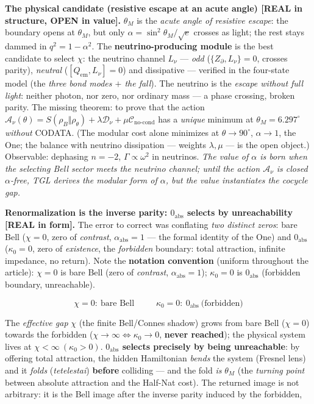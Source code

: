 \documentclass[11pt]{article}
\theoremstyle{definition}\newtheorem{deriv}{Derivation}
\begin{document}
\textbf{The physical candidate (resistive escape at an acute angle) \textsf{[REAL in structure, OPEN in value]}.} $\theta_M$ is the \emph{acute angle of resistive escape}: the boundary opens at $\theta_M$, but only $\alpha=\sin^2\theta_M/\sqrt e$ crosses as light; the rest stays dammed in $q^2=1-\alpha^2$. The \textbf{neutrino-producing module} is the best candidate to select $\chi$: the neutrino channel $L_\nu$ --- \emph{odd} ($\{Z_\partial,L_\nu\}=0$, crosses parity), \emph{neutral} ($[Q_{\mathrm{em}},L_\nu]=0$) and dissipative --- verified in the four-state model (the \emph{three bond modes $+$ the fall}). The neutrino is the \emph{escape without full light}: neither photon, nor zero, nor ordinary mass --- a phase crossing, broken parity. The missing theorem: to prove that the action $\mathcal A_\nu(\theta)=S(\rho_B\Vert\rho_\theta)+\lambda\mathcal D_\nu+\mu\mathcal C_{\mathrm{no\text{-}cond}}$ has a \emph{unique} minimum at $\theta_M=6.297^\circ$ \emph{without} CODATA. (The modular cost alone minimizes at $\theta\to90^\circ$, $\alpha\to1$, the One; the balance with neutrino dissipation --- weights $\lambda,\mu$ --- is the open object.) Observable: dephasing $n=-2$, $\Gamma\propto\omega^2$ in neutrinos. \emph{The value of $\alpha$ is born when the selecting Bell sector meets the neutrino channel; until the action $\mathcal A_\nu$ is closed $\alpha$-free, TGL derives the modular form of $\alpha$, but the value instantiates the cocycle gap.}

\textbf{Renormalization is the inverse parity: $0_{\mathrm{abs}}$ selects by unreachability \textsf{[REAL in form]}.} The error to correct was conflating \emph{two distinct zeros}: bare Bell ($\chi=0$, zero of \emph{contrast}, $\alpha_{\mathrm{abs}}=1$ --- the formal identity of the One) and $0_{\mathrm{abs}}$ ($\kappa_0=0$, zero of \emph{existence}, the \emph{forbidden} boundary: total attraction, infinite impedance, no return). Note the \textbf{notation convention} (uniform throughout the article): $\chi=0$ is bare Bell (zero of \emph{contrast}, $\alpha_{\mathrm{abs}}=1$); $\kappa_0=0$ is $0_{\mathrm{abs}}$ (forbidden boundary, unreachable).

\begin{equation}\boxed{\;\chi=0:\ \text{bare Bell}\;}\qquad \boxed{\;\kappa_0=0:\ 0_{\mathrm{abs}}\ \text{(forbidden)}\;}\end{equation}

The \emph{effective gap} $\chi$ (the finite Bell/Connes shadow) grows from bare Bell ($\chi=0$) towards the forbidden ($\chi\to\infty\Leftrightarrow\kappa_0\to0$, \textbf{never reached}); the physical system lives at $\chi<\infty\ (\kappa_0>0)$. \textbf{$0_{\mathrm{abs}}$ selects precisely by being unreachable}: by offering total attraction, the hidden Hamiltonian \emph{bends} the system (Fresnel lens) and it \emph{folds} (\textit{tetelestai}) \textbf{before} colliding --- and the fold \emph{is} $\theta_M$ (the \emph{turning point} between absolute attraction and the Half-Nat cost). The returned image is not arbitrary: it is the Bell image after the inverse parity induced by the forbidden,
\end{document}
